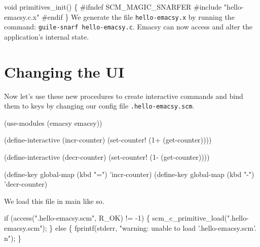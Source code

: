 \nwenddocs{}\endmoddef\nwstartdeflinemarkup{}\nwenddeflinemarkup
void primitives_init()
\{
#ifndef SCM_MAGIC_SNARFER
  #include "hello-emacsy.c.x"
#endif
\}
\nwendcode{}We generate the file \verb|hello-emacsy.x| by running the command:
\verb|guile-snarf hello-emacsy.c|. Emacsy can now access and alter the
application's internal state.

\section{Changing the UI}
Now let's use these new procedures to create interactive commands and
bind them to keys by changing our config file \verb|.hello-emacsy.scm|.

\nwenddocs{}\endmoddef\nwstartdeflinemarkup{}\nwenddeflinemarkup
(use-modules (emacsy emacsy))

(define-interactive (incr-counter)
 (set-counter! (1+ (get-counter))))

(define-interactive (decr-counter)
 (set-counter! (1- (get-counter))))

(define-key global-map 
 (kbd "=") 'incr-counter)
(define-key global-map 
 (kbd "-") 'decr-counter)
\nwendcode{}\nwdocspar

We load this file in {\Tt{}main\nwendquote} like so.

\nwenddocs{}\endmoddef\nwstartdeflinemarkup{}\nwenddeflinemarkup
if (access(".hello-emacsy.scm", R_OK) != -1) \{
  scm_c_primitive_load(".hello-emacsy.scm");
\} else \{
  fprintf(stderr, "warning: unable to load '.hello-emacsy.scm'.\\n");
\}
\nwendcode{}\nwdocspar

